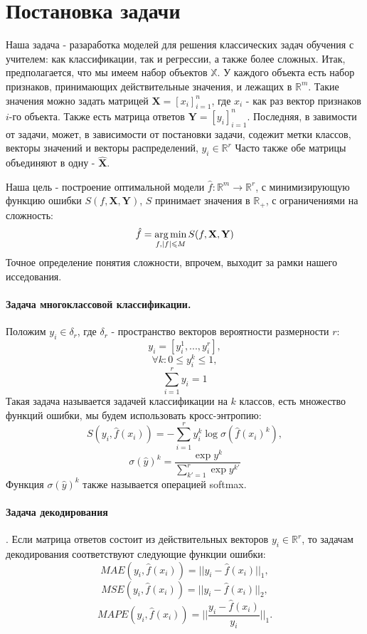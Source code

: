 \documentclass[12pt,twoside]{article}
\begin{document}
\section{Постановка задачи}

Наша задача  - разаработка моделей для решения классических задач обучения с учителем: как классификации, так и регрессии, а также более сложных. Итак, предполагается, что мы имеем набор объектов $\mathbb{X}$.  У каждого объекта есть набор признаков, принимающих действительные значения,  и лежащих в $\mathbb{R}^m$.  Такие значения можно задать матрицей 
$\mathbf{X} = [x_i]_{i = 1}^n$, где $x_i$ -  как раз вектор признаков $i$-го объекта. Также есть матрица ответов $\mathbf{Y} = [y_i]_{i = 1}^n$. Последняя, в завимости от задачи, может, в зависимости от постановки задачи, содежит метки классов, векторы значений и векторы распределений, $y_i \in \mathbb{R}^r$ Часто также обе матрицы объединяют в одну - $\hat{\mathbf{X}}$.

Наша цель - построение оптимальной модели $\hat{f}: \mathbb{R}^m \rightarrow \mathbb{R}^r$, с минимизирующую функцию ошибки $S(f,  \mathbf{X}, \mathbf{Y})$, $S$ принимает значения в $\mathbb{R}_+$, с ограничениями на сложность:
$$ \hat{f} = \argmin\limits_{f, |f| \leq M}{S(f, \mathbf{X}, \mathbf{Y})}$$ 
Точное определение понятия сложности, впрочем, выходит за рамки нашего исседования. 

\paragraph{Задача многоклассовой классификации.}
Положим $y_i \in \delta_r$, где $\delta_r$ - пространство векторов вероятности размерности $r$:
$$ y_i = [y_i^1, ..., y_i^r],$$
$$ \forall k: 0 \leq y_i^k  \leq 1,$$
$$ \sum\limits_{i = 1}^r y_i = 1$$	
Такая задача называется задачей классификации на $k$ классов, есть множество функций ошибки, мы будем использовать кросс-энтропию: 
$$S(y_i, \hat{f}(x_i)) =  - \sum\limits_{i=1}^r y_i^k \log \sigma(\hat{f}(x_i)^k), $$
$$\sigma (\hat{y})^k = \frac{\exp y^k}{\sum\limits_{k' = 1}^{r} \exp y^{k'}} $$
Функция $\sigma (\hat{y})^k $ также называется операцией softmax.

\paragraph{Задача декодирования}.
Если матрица ответов состоит из действительных векторов  $y_i \in \mathbb{R}^r$, то задачам декодирования соответствуют следующие функции ошибки:
$$MAE(y_i, \hat{f}(x_i)) = || y_i - \hat{f}(x_i) ||_1,$$
$$MSE(y_i, \hat{f}(x_i)) = || y_i - \hat{f}(x_i) ||_2,$$
$$MAPE(y_i, \hat{f}(x_i)) = ||\frac{ y_i - \hat{f}(x_i)}{y_i} ||_1.$$
\end{document}
